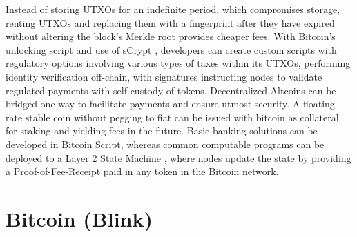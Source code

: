 \documentclass[a4paper,10pt]{article}
\begin{document}
Instead of storing UTXOs for an indefinite period, which compromises storage, renting UTXOs and replacing them with a fingerprint after they have expired without altering the block’s Merkle root provides cheaper fees. With Bitcoin’s unlocking script and use of sCrypt \cite{sCrypt}, developers can create custom scripts with regulatory options involving various types of taxes within its UTXOs, performing identity verification off-chain, with signatures instructing nodes to validate regulated payments with self-custody of tokens. Decentralized Altcoins can be bridged one way to facilitate payments and ensure utmost security. A floating rate stable coin \cite{stablecoin} without pegging to fiat can be issued with bitcoin as collateral for staking and yielding fees in the future. Basic banking solutions can be developed in Bitcoin Script, whereas common computable programs can be deployed to a Layer 2 State Machine \cite{wood2014ethereum}, where nodes update the state by providing a Proof-of-Fee-Receipt paid in any token in the Bitcoin network.

\section{Bitcoin (Blink)} 
\end{document}
